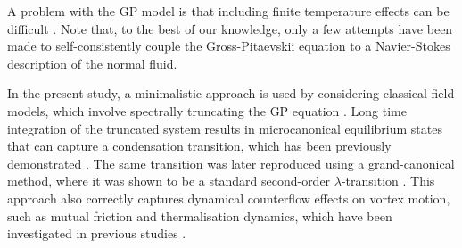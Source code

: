 \documentclass[sn-mathphys]{sn-jnl}%
\begin{document}
A problem with the GP model is that including finite temperature effects can be difficult \cite{Gardiner00,Gardiner02,Calzetta07,Berloff14}. 
Note that, to the best of our knowledge, only a few attempts \cite{Coste1998,brachet2022coupling} have been made to self-consistently couple the Gross-Pitaevskii equation to a Navier-Stokes description of the normal fluid.

In the present study, a minimalistic approach is used by considering classical field models, which involve spectrally truncating the GP equation \cite{Proukakis08}. Long time integration of the truncated system results in microcanonical equilibrium states that can capture a condensation transition, which has been previously demonstrated \cite{Davis01}. The same transition was later reproduced using a grand-canonical method, where it was shown to be a standard second-order $\lambda$-transition \cite{Krstulovic11}. This approach also correctly captures dynamical counterflow effects on vortex motion, such as mutual friction and thermalisation dynamics, which have been investigated in previous studies \cite{Krstulovic11, Krstulovic11a}.
\end{document}
